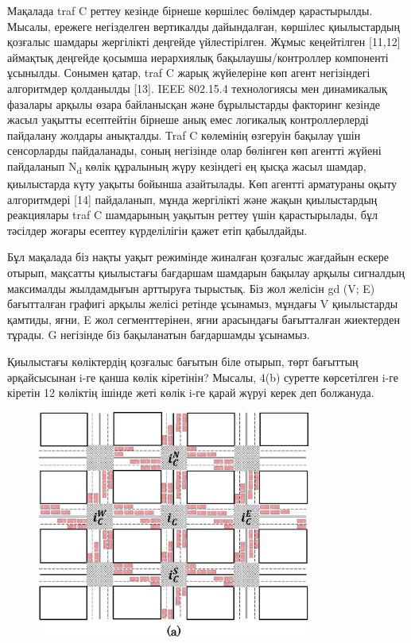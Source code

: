Мақалада traf C реттеу кезінде бірнеше көршілес бөлімдер қарастырылды.
Мысалы, ережеге негізделген вертикалды дайындалған, көршілес
қиылыстардың қозғалыс шамдары жергілікті деңгейде үйлестірілген. Жұмыс
кеңейтілген {[}11,12{]} аймақтық деңгейде қосымша иерархиялық
бақылаушы/контроллер компоненті ұсынылды. Сонымен қатар, traf C жарық
жүйелеріне көп агент негізіндегі алгоритмдер қолданылды {[}13{]}. IEEE
802.15.4 технологиясы мен динамикалық фазалары арқылы өзара байланысқан
және бұрылыстарды факторинг кезінде жасыл уақытты есептейтін бірнеше
анық емес логикалық контроллерлерді пайдалану жолдары анықталды. Тraf C
көлемінің өзгеруін бақылау үшін сенсорларды пайдаланады, соның негізінде
олар бөлінген көп агентті жүйені пайдаланып N\textsubscript{d} көлік
құралының жүру кезіндегі ең қысқа жасыл шамдар, қиылыстарда күту уақыты
бойынша азайтылады. Көп агентті арматураны оқыту алгоритмдері {[}14{]}
пайдаланып, мұнда жергілікті және жақын қиылыстардың реакциялары traf C
шамдарының уақытын реттеу үшін қарастырылады, бұл тәсілдер жоғары
есептеу күрделілігін қажет етіп қабылдайды.

Бұл мақалада біз нақты уақыт режимінде жиналған қозғалыс жағдайын ескере
отырып, мақсатты қиылыстағы бағдаршам шамдарын бақылау арқылы сигналдың
максималды жылдамдығын арттыруға тырыстық. Біз жол желісін gd (V; E)
бағытталған графигі арқылы желісі ретінде ұсынамыз, мұндағы V
қиылыстарды қамтиды, яғни, E жол сегменттерінен, яғни арасындағы
бағытталған жиектерден тұрады. G негізінде біз бақыланатын бағдаршамды
ұсынамыз.

Қиылыстағы көліктердің қозғалыс бағытын біле отырып, төрт бағыттың
әрқайсысынан i-ге қанша көлік кіретінін? Мысалы, 4(b) суретте
көрсетілген i-ге кіретін 12 көліктің ішінде жеті көлік i-ге қарай жүруі
керек деп болжануда.

\begin{figure}[H]
	\centering
	\includegraphics[width=0.8\textwidth]{assets/165}
	\caption*{}
\end{figure}

